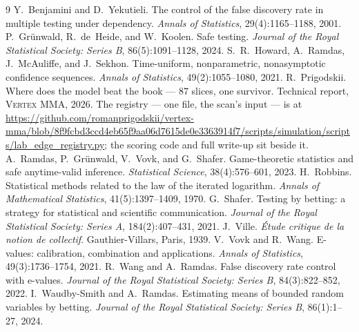 \documentclass{article}
\begin{document}
\begin{thebibliography}{9}
 Y.~Benjamini and D.~Yekutieli. The control of the false discovery rate in multiple testing under dependency. \emph{Annals of Statistics}, 29(4):1165--1188, 2001.
 P.~Gr\"unwald, R.~de~Heide, and W.~Koolen. Safe testing. \emph{Journal of the Royal Statistical Society: Series B}, 86(5):1091--1128, 2024.
 S.~R.~Howard, A.~Ramdas, J.~McAuliffe, and J.~Sekhon. Time-uniform, nonparametric, nonasymptotic confidence sequences. \emph{Annals of Statistics}, 49(2):1055--1080, 2021.
 R.~Prigodskii. Where does the model beat the book --- 87 slices, one survivor. Technical report, \textsc{Vertex MMA}, 2026. The registry --- one file, the scan's input --- is at \url{https://github.com/romanprigodskii/vertex-mma/blob/8f9fcbd3ccd4eb65f9aa06d7615de0e3363914f7/scripts/simulation/scripts/lab_edge_registry.py}; the scoring code and full write-up sit beside it.
 A.~Ramdas, P.~Gr\"unwald, V.~Vovk, and G.~Shafer. Game-theoretic statistics and safe anytime-valid inference. \emph{Statistical Science}, 38(4):576--601, 2023.
 H.~Robbins. Statistical methods related to the law of the iterated logarithm. \emph{Annals of Mathematical Statistics}, 41(5):1397--1409, 1970.
 G.~Shafer. Testing by betting: a strategy for statistical and scientific communication. \emph{Journal of the Royal Statistical Society: Series A}, 184(2):407--431, 2021.
 J.~Ville. \emph{\'Etude critique de la notion de collectif}. Gauthier-Villars, Paris, 1939.
 V.~Vovk and R.~Wang. E-values: calibration, combination and applications. \emph{Annals of Statistics}, 49(3):1736--1754, 2021.
 R.~Wang and A.~Ramdas. False discovery rate control with e-values. \emph{Journal of the Royal Statistical Society: Series B}, 84(3):822--852, 2022.
 I.~Waudby-Smith and A.~Ramdas. Estimating means of bounded random variables by betting. \emph{Journal of the Royal Statistical Society: Series B}, 86(1):1--27, 2024.
\end{thebibliography}
\end{document}
